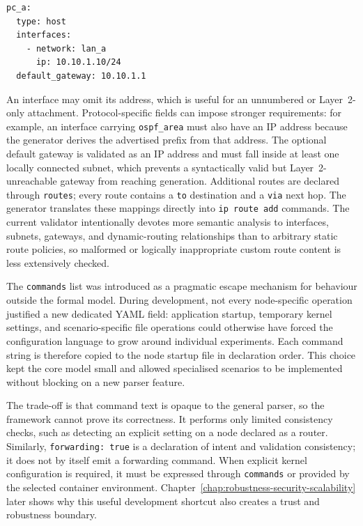 \begin{lstlisting}[caption={Host with one addressed interface and a default gateway.},label={lst:host-yaml}]
pc_a:
  type: host
  interfaces:
    - network: lan_a
      ip: 10.10.1.10/24
  default_gateway: 10.10.1.1
\end{lstlisting}

An interface may omit its address, which is useful for an unnumbered or
Layer~2-only attachment. Protocol-specific fields can impose stronger
requirements: for example, an interface carrying \texttt{ospf\_area} must also
have an IP address because the generator derives the advertised prefix from
that address. The optional default gateway is validated as an IP address and
must fall inside at least one locally connected subnet, which prevents a
syntactically valid but Layer~2-unreachable gateway from reaching generation.
Additional routes are declared through \texttt{routes}; every route contains a
\texttt{to} destination and a \texttt{via} next hop. The generator translates
these mappings directly into \texttt{ip route add} commands. The current
validator intentionally devotes more semantic analysis to interfaces,
subnets, gateways, and dynamic-routing relationships than to arbitrary static
route policies, so malformed or logically inappropriate custom route content
is less extensively checked.

The \texttt{commands} list was introduced as a pragmatic escape mechanism for
behaviour outside the formal model. During development, not every node-specific
operation justified a new dedicated YAML field: application startup, temporary
kernel settings, and scenario-specific file operations could otherwise have
forced the configuration language to grow around individual experiments. Each
command string is therefore copied to the node startup file in declaration
order. This choice kept the core model small and allowed specialised scenarios
to be implemented without blocking on a new parser feature.

The trade-off is that command text is opaque to the general parser, so the
framework cannot prove its correctness. It performs only limited consistency
checks, such as detecting an explicit  setting on a node
declared as a router. Similarly, \texttt{forwarding: true} is a declaration of
intent and validation consistency; it does not by itself emit a forwarding
command. When explicit kernel configuration is required, it must be expressed
through \texttt{commands} or provided by the selected container environment.
Chapter~\ref{chap:robustness-security-scalability} later shows why this useful
development shortcut also creates a trust and robustness boundary.

